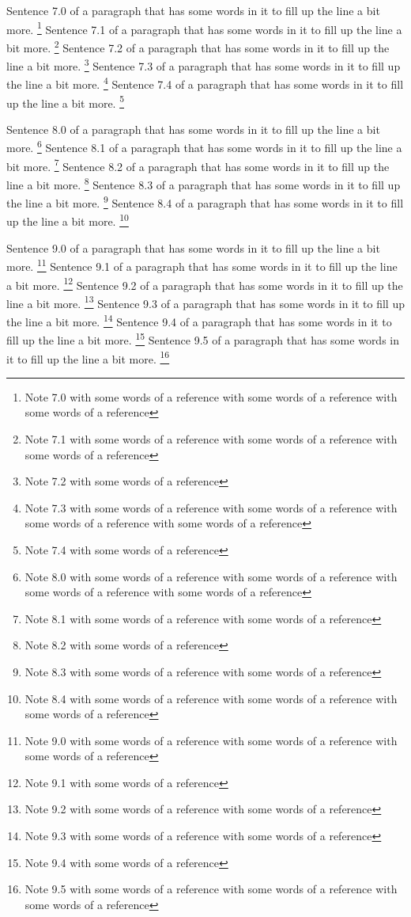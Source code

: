 Sentence 7.0 of a paragraph that has some words in it to fill up the line a bit more. \footnote{Note 7.0 with some words of a reference with some words of a reference with some words of a reference} Sentence 7.1 of a paragraph that has some words in it to fill up the line a bit more. \footnote{Note 7.1 with some words of a reference with some words of a reference with some words of a reference} Sentence 7.2 of a paragraph that has some words in it to fill up the line a bit more. \footnote{Note 7.2 with some words of a reference} Sentence 7.3 of a paragraph that has some words in it to fill up the line a bit more. \footnote{Note 7.3 with some words of a reference with some words of a reference with some words of a reference with some words of a reference} Sentence 7.4 of a paragraph that has some words in it to fill up the line a bit more. \footnote{Note 7.4 with some words of a reference}

Sentence 8.0 of a paragraph that has some words in it to fill up the line a bit more. \footnote{Note 8.0 with some words of a reference with some words of a reference with some words of a reference with some words of a reference} Sentence 8.1 of a paragraph that has some words in it to fill up the line a bit more. \footnote{Note 8.1 with some words of a reference with some words of a reference} Sentence 8.2 of a paragraph that has some words in it to fill up the line a bit more. \footnote{Note 8.2 with some words of a reference} Sentence 8.3 of a paragraph that has some words in it to fill up the line a bit more. \footnote{Note 8.3 with some words of a reference with some words of a reference} Sentence 8.4 of a paragraph that has some words in it to fill up the line a bit more. \footnote{Note 8.4 with some words of a reference with some words of a reference with some words of a reference}

Sentence 9.0 of a paragraph that has some words in it to fill up the line a bit more. \footnote{Note 9.0 with some words of a reference with some words of a reference with some words of a reference} Sentence 9.1 of a paragraph that has some words in it to fill up the line a bit more. \footnote{Note 9.1 with some words of a reference} Sentence 9.2 of a paragraph that has some words in it to fill up the line a bit more. \footnote{Note 9.2 with some words of a reference with some words of a reference} Sentence 9.3 of a paragraph that has some words in it to fill up the line a bit more. \footnote{Note 9.3 with some words of a reference with some words of a reference} Sentence 9.4 of a paragraph that has some words in it to fill up the line a bit more. \footnote{Note 9.4 with some words of a reference} Sentence 9.5 of a paragraph that has some words in it to fill up the line a bit more. \footnote{Note 9.5 with some words of a reference with some words of a reference with some words of a reference}

